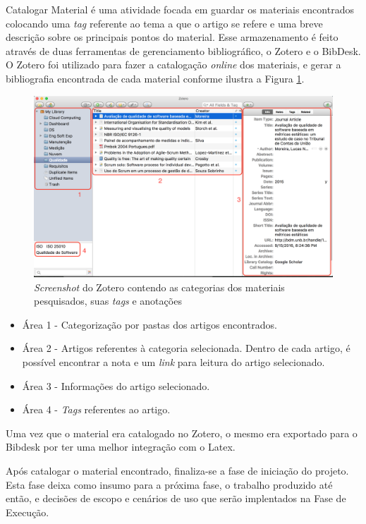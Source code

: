 Catalogar Material é uma atividade focada em guardar os materiais encontrados colocando uma  \textit{tag} referente ao tema a que o artigo se refere e uma breve descrição sobre os principais pontos do material. Esse armazenamento é feito através de duas ferramentas de gerenciamento bibliográfico, o Zotero e o BibDesk. O Zotero foi utilizado para fazer a catalogação \textit{online} dos materiais, e gerar a bibliografia encontrada de cada material conforme ilustra a Figura \ref{img:zotero}.

\graphicspath{{figuras/}}
\begin{figure}[H]
\centering
\includegraphics[scale=0.30]{zotero_edit2.png}
\caption{\textit{Screenshot} do Zotero contendo as categorias dos materiais pesquisados, suas \textit{tags} e anotações}
\label{img:zotero}
\end{figure}

\begin{itemize}
\item Área 1 - Categorização por pastas dos artigos encontrados.
\item Área 2 - Artigos referentes à categoria selecionada. Dentro de cada artigo, é possível encontrar a nota e um \textit{link} para leitura do artigo selecionado.
\item Área 3 - Informações do artigo selecionado.
\item Área 4 - \textit{Tags} referentes ao artigo.
\end{itemize}
Uma vez que o material era catalogado no Zotero, o mesmo era exportado para o Bibdesk por ter uma melhor integração com o Latex.

Após catalogar o material encontrado, finaliza-se a fase de iniciação do projeto. Esta fase deixa como insumo para a próxima fase, o trabalho produzido até então, e decisões de escopo e cenários de uso que serão implentados na Fase de Execução. 

